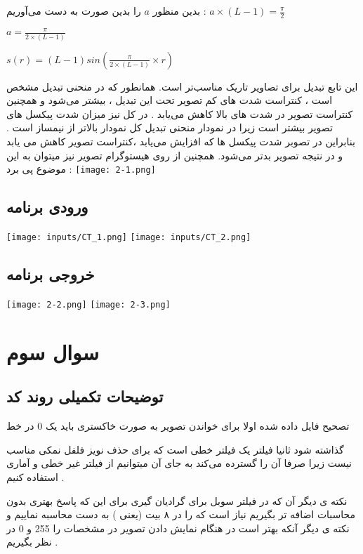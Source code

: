 \documentclass[12pt]{article}
\begin{document}
بدین منظور 
$a$
را بدین صورت به دست می‌آوریم :
			$a\times (L-1) = \frac{\pi}{2} $
			
			$a=\frac{\pi}{2 \times (L-1)}$
			
			$s(r) = (L-1)sin(\frac{\pi}{2 \times (L-1)} \times r)$
	
	این تابع تبدیل برای تصاویر تاریک مناسب‌تر است. همانطور که در منحنی تبدیل مشخص است ، کنتراست شدت های کم تصویر تحت این تبدیل ، بیشتر می‌شود و همچنین کنتراست تصویر در شدت های بالا کاهش می‌یابد . در کل نیز میزان شدت پیکسل های تصویر بیشتر است زیرا در نمودار منحنی تبدیل کل نمودار بالاتر از نیمساز است . بنابراین در تصوبر 
	شدت پیکسل ها که افزایش می‌یابد ،کنتراست تصویر کاهش می یابد و در نتیجه تصویر بدتر می‌شود. 
	همچنین از روی هیستوگرام تصویر نیز میتوان به این موضوع پی برد :
	\texttt{[image: 2-1.png]}

	
	
		\subsection{ورودی برنامه}
		\texttt{[image: inputs/CT\_1.png]}
		\texttt{[image: inputs/CT\_2.png]}
		\subsection{خروجی برنامه}
		\texttt{[image: 2-2.png]}
		\texttt{[image: 2-3.png]}
		
		\newpage
		
		\section{سوال سوم }
		\subsection{توضیحات تکمیلی روند کد}
	تصحیح فایل داده شده
	اولا برای خواندن تصویر به صورت خاکستری باید یک 0 در خط
	
		
		گذاشته شود
		ثانیا فیلتر 
		یک فیلتر خطی است که برای حذف نویز فلفل نمکی مناسب نیست زیرا صرفا آن را گسترده می‌کند 
		به جای آن میتوانیم از فیلتر غیر خطی و آماری 
		استفاده کنیم .
		
		
		نکته ی دیگر آن که در فیلتر سوبل برای گرادیان گیری برای این که پاسخ بهتری بدون محاسبات اضافه تر بگیریم نیاز است که 
		را در ۸ بیت (یعنی 
		) به دست محاسبه نماییم 
		و نکته ی دیگر آنکه بهتر است در هنگام نمایش دادن تصویر در 
		مشخصات 
		را 255 و 0 در نظر بگیریم .
		
\end{document}
